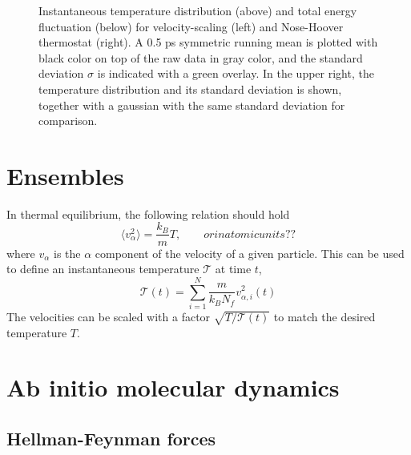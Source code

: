 \documentclass[11pt]{scrbook}   %
\begin{document}
\begin{figure}[htbp]
  \centering
  \caption{
    Instantaneous temperature distribution (above) and total energy fluctuation (below) 
    for velocity-scaling (left) and Nose-Hoover thermostat (right). A 0.5 ps symmetric running mean 
    is plotted with black color on top of the raw data in gray color, and the standard deviation $\sigma$ 
    is indicated with a green overlay. In the upper right, the temperature distribution and its 
    standard deviation is shown, together with a gaussian with the same standard deviation for comparison.
   }
  \label{fig:md_test_temperature}
\end{figure}

\section{Ensembles}

In thermal equilibrium, the following relation should hold
\begin{equation}
  \langle v_{\alpha}^2 \rangle = \frac{k_B}{m} T, \qquad{or in atomic units??}
\end{equation}
where $v_{\alpha}$ is the $\alpha$ component of the velocity of a given particle.
This can be used to define an instantaneous temperature $\mathcal{T}$ at time $t$,
\begin{equation}
  \mathcal{T}(t) = \sum_{i=1}^N \frac{m}{k_B N_f} v_{\alpha,i}^2(t)
\end{equation}
The velocities can be scaled with a factor $\sqrt{T/\mathcal{T}(t)}$ to match the desired temperature $T$.




\section{Ab initio molecular dynamics}

\subsection{Hellman-Feynman forces}
\end{document}
